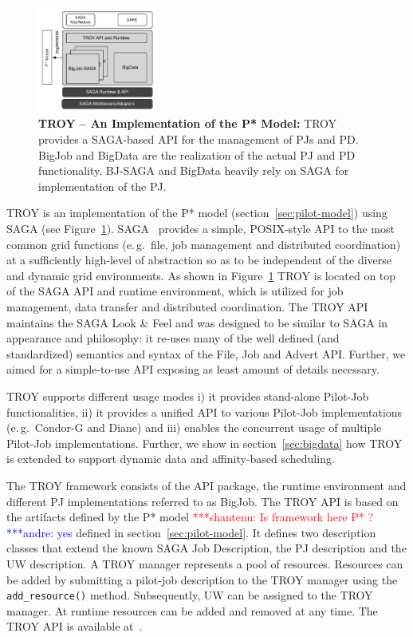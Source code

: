 \documentclass[conference,final]{IEEEtran}
\newcommand{\jhanote}[1]{ {\textcolor{red} { ***shantenu: #1 }}}
\newcommand{\alnote}[1]{ {\textcolor{blue} { ***andre: #1 }}}
\newcommand{\alnote}[1]{}
\newcommand{\jhanote}[1]{}
\newcommand{\upp}{\vspace*{-0.5em}}
\begin{document}

\begin{figure}[t]
	\centering
		\includegraphics[width=0.35\textwidth]{figures/pstar_troy.pdf}
	\caption{\textbf{TROY -- An Implementation of the P* Model:}  TROY provides 
	a SAGA-based API for the management of PJs and PD. BigJob and BigData are 
	the realization of the actual PJ and PD functionality. BJ-SAGA and BigData 
	heavily rely on SAGA for implementation of the PJ.\upp
	}
	\label{fig:figures_pstar_troy}
\end{figure}

TROY is an implementation of the P* model (section~\ref{sec:pilot-model}) using
SAGA (see Figure~\ref{fig:figures_pstar_troy}). SAGA~\cite{saga_url,saga_gfd90}
provides a simple, POSIX-style API to the most common grid functions (e.\,g.\
file, job management and distributed coordination) at a sufficiently high-level
of abstraction so as to be independent of the diverse and dynamic grid
environments. As shown in Figure~\ref{fig:figures_pstar_troy} TROY is located on
top of the SAGA API and runtime environment, which is utilized for job
management, data transfer and distributed coordination. The TROY API maintains
the SAGA Look \& Feel and was designed to be similar to SAGA in appearance and
philosophy: it re-uses many of the well defined (and standardized) semantics and
syntax of the File, Job and Advert API. Further, we aimed for a simple-to-use
API exposing as least amount of details necessary.

TROY supports different usage modes i) it provides stand-alone
Pilot-Job functionalities, ii) it provides a unified API to various
Pilot-Job implementations (e.\,g.\ Condor-G and Diane) and iii)
enables the concurrent usage of multiple Pilot-Job
implementations. Further, we show in section~\ref{sec:bigdata} how
TROY is extended to support dynamic data and affinity-based
scheduling.

The TROY framework consists of the API package, the runtime environment and
different PJ implementations referred to as BigJob. The TROY API is based on the
artifacts defined by the P* model \jhanote{Is framework here P* ?}\alnote{yes} defined in
section~\ref{sec:pilot-model}. It defines two description classes that extend
the known SAGA Job Description, the PJ description and the UW description. A
TROY manager represents a pool of resources. Resources can be added by
submitting a pilot-job description to the TROY manager using the
\texttt{add\_resource()} method. Subsequently, UW can be assigned to the TROY
manager. At runtime resources can be added and removed at any time. 
The TROY API is available at~\cite{troy_api}.
\end{document}

